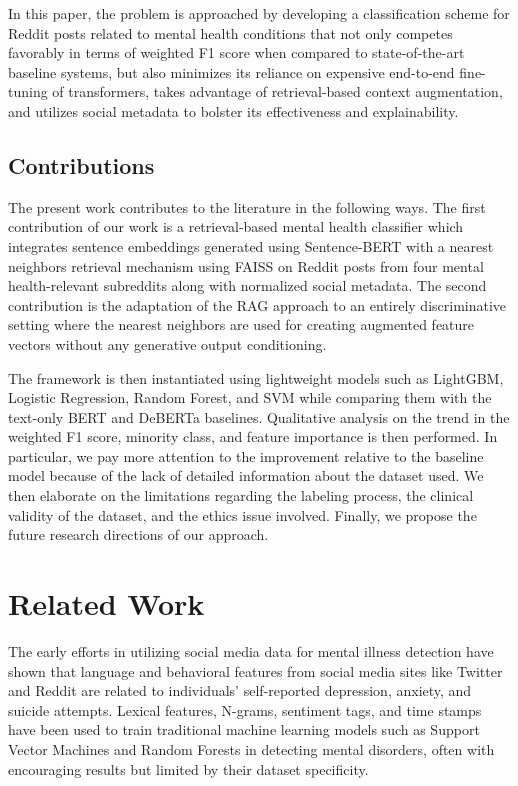\documentclass[11pt]{article}
\begin{document}
In this paper, the problem is approached by developing a classification scheme for Reddit posts related to mental health conditions that not only competes favorably in terms of weighted F1 score when compared to state-of-the-art baseline systems, but also minimizes its reliance on expensive end-to-end fine-tuning of transformers, takes advantage of retrieval-based context augmentation, and utilizes social metadata to bolster its effectiveness and explainability.

\subsection{Contributions}

The present work contributes to the literature in the following ways. The first contribution of our work is a retrieval-based mental health classifier which integrates sentence embeddings generated using Sentence-BERT with a nearest neighbors retrieval mechanism using FAISS on Reddit posts from four mental health-relevant subreddits along with normalized social metadata. The second contribution is the adaptation of the RAG approach to an entirely discriminative setting where the nearest neighbors are used for creating augmented feature vectors without any generative output conditioning.

The framework is then instantiated using lightweight models such as LightGBM, Logistic Regression, Random Forest, and SVM while comparing them with the text-only BERT and DeBERTa baselines. Qualitative analysis on the trend in the weighted F1 score, minority class, and feature importance is then performed. In particular, we pay more attention to the improvement relative to the baseline model because of the lack of detailed information about the dataset used. We then elaborate on the limitations regarding the labeling process, the clinical validity of the dataset, and the ethics issue involved. Finally, we propose the future research directions of our approach.

\section{Related Work}

The early efforts in utilizing social media data for mental illness detection have shown that language and behavioral features from social media sites like Twitter and Reddit are related to individuals' self-reported depression, anxiety, and suicide attempts. Lexical features, N-grams, sentiment tags, and time stamps have been used to train traditional machine learning models such as Support Vector Machines and Random Forests in detecting mental disorders, often with encouraging results but limited by their dataset specificity.
\end{document}
